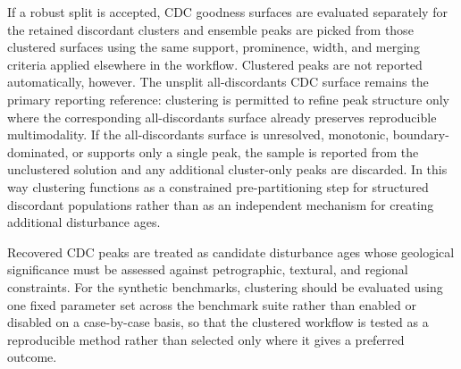 If a robust split is accepted, CDC goodness surfaces are evaluated separately for the retained discordant clusters and ensemble peaks are picked from those clustered surfaces using the same support, prominence, width, and merging criteria applied elsewhere in the workflow. Clustered peaks are not reported automatically, however. The unsplit all-discordants CDC surface remains the primary reporting reference: clustering is permitted to refine peak structure only where the corresponding all-discordants surface already preserves reproducible multimodality. If the all-discordants surface is unresolved, monotonic, boundary-dominated, or supports only a single peak, the sample is reported from the unclustered solution and any additional cluster-only peaks are discarded. In this way clustering functions as a constrained pre-partitioning step for structured discordant populations rather than as an independent mechanism for creating additional disturbance ages.

Recovered CDC peaks are treated as candidate disturbance ages whose geological significance must be assessed against petrographic, textural, and regional constraints. For the synthetic benchmarks, clustering should be evaluated using one fixed parameter set across the benchmark suite rather than enabled or disabled on a case-by-case basis, so that the clustered workflow is tested as a reproducible method rather than selected only where it gives a preferred outcome.
